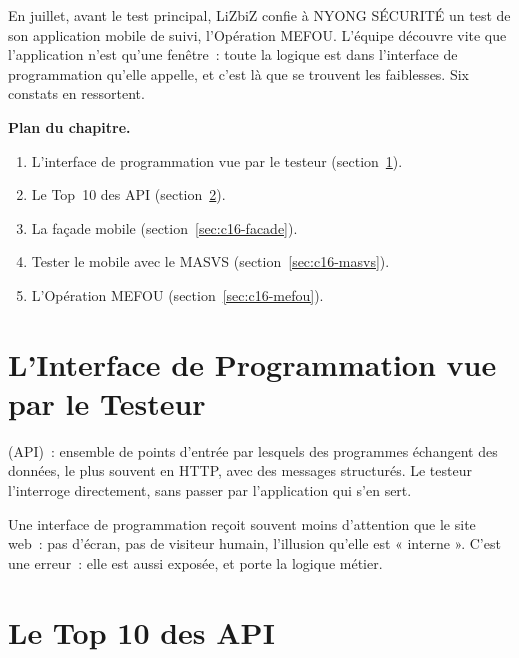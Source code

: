 En juillet, avant le test principal, LiZbiZ confie à NYONG SÉCURITÉ un test
de son application mobile de suivi, l'Opération MEFOU. L'équipe découvre
vite que l'application n'est qu'une fenêtre~: toute la logique est dans
l'interface de programmation qu'elle appelle, et c'est là que se trouvent
les faiblesses. Six constats en ressortent.

\medskip
\textbf{Plan du chapitre.}
\begin{enumerate}
    \item L'interface de programmation vue par le testeur
          (section~\ref{sec:c16-api}).
    \item Le Top~10 des API (section~\ref{sec:c16-top10}).
    \item La façade mobile (section~\ref{sec:c16-facade}).
    \item Tester le mobile avec le MASVS (section~\ref{sec:c16-masvs}).
    \item L'Opération MEFOU (section~\ref{sec:c16-mefou}).
\end{enumerate}

\separateur

\section{L'Interface de Programmation vue par le Testeur}
\label{sec:c16-api}

\begin{boxdef}
 (API)~: ensemble de points d'entrée
par lesquels des programmes échangent des données, le plus souvent en HTTP,
avec des messages structurés. Le testeur l'interroge directement, sans
passer par l'application qui s'en sert.
\end{boxdef}

Une interface de programmation reçoit souvent moins d'attention que le site
web~: pas d'écran, pas de visiteur humain, l'illusion qu'elle est « interne ».
C'est une erreur~: elle est aussi exposée, et porte la logique métier.

\section{Le Top 10 des API}
\label{sec:c16-top10}

